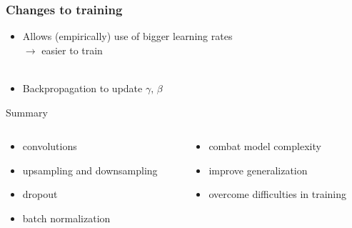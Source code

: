 \documentclass[aspectratio=169,14pt]{beamer}
\begin{document}
\begin{frame}
    \frametitle{Changes to training}
\begin{itemize}
    \item Allows (empirically) use of bigger learning rates \\
    \qquad\qquad $\rightarrow$ easier to train ~\\~\\
    \item Backpropagation to update $\gamma,\,\beta$
\end{itemize}
\end{frame}
%
%
\begin{frame}{Summary}
\begin{columns}[t]
    \begin{column}{0.5\textwidth}
\begin{itemize}
\item convolutions
\item upsampling and downsampling
\item dropout
\item batch normalization
\end{itemize}
\end{column}
\begin{column}{0.5\textwidth}
\begin{itemize}
    \item combat model complexity
    \item improve generalization
    \item overcome difficulties in training
\end{itemize}
\end{column}
\end{columns}
\end{frame}
\end{document}
